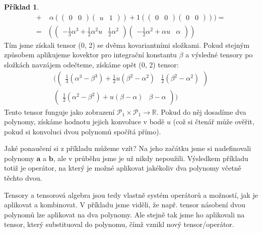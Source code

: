 \documentclass[a5paper,12pt]{amsbook}
\theoremstyle{definition}
\newtheorem{example}{Příklad}[chapter]
\newcommand{\myvec}[1]{\bm{#1}}
\begin{document}
\begin{example}
\begin{equation*}
\begin{split}
  + & \;\alpha((\begin{array}{cc}0 & 0\end{array})(\begin{array}{cc}u & 1\end{array}))
  + 1((\begin{array}{cc}0 & 0\end{array})(\begin{array}{cc}0 & 0\end{array}))
)
= \\ = &
((\begin{array}{cc}-\frac{1}{3}\alpha^3 + \frac{1}{2}\alpha^2u & \frac{1}{2}\alpha^2\end{array})
  (\begin{array}{cc}-\frac{1}{2}\alpha^2 + \alpha u & \alpha\end{array}))
\end{split}
\end{equation*}
Tím jsme získali tensor (0, 2) se dvěma kovariantními složkami. Pokud stejným způsobem aplikujeme
kovektor pro integrační konstantu $\beta$ a výsledné tensory po složkách navzájem odečteme, získáme
opět (0, 2) tensor:
\begin{equation*}
\begin{split}
((\begin{array}{cc}\frac{1}{3}(\alpha^3 - \beta^3) + \frac{1}{2}u(\beta^2 - \alpha^2) & \frac{1}{2}(\beta^2 - \alpha^2)\end{array}) \\
  (\begin{array}{cc}\frac{1}{2}(\alpha^2 - \beta^2) + u(\beta - \alpha) & \beta - \alpha\end{array}))
\end{split}
\end{equation*}
Tento tensor funguje jako zobrazení $\mathcal{P}_1\times\mathcal{P}_1\rightarrow\mathbb{R}$. Pokud do něj
dosadíme dva polynomy, získáme hodnotu jejich konvoluce v bodě $u$ (což si čtenář může ověřit, pokud si
konvoluci dvou polynomů spočítá přímo).

\end{example}

\noindent
Jaké ponaučení si z příkladu můžeme vzít? Na jeho začátku jsme si nadefinovali polynomy $\myvec{a}$
a $\myvec{b}$, ale v průběhu jsme je už nikdy nepoužili. Výsledkem příkladu totiž je operátor, na
který je možné aplikovat jakékoliv dva polynomy včetně těchto dvou.

Tensory a tensorová algebra jsou tedy vlastně systém operátorů a možností, jak je aplikovat a kombinovat.
V příkladu jsme viděli, že např. tensor násobení dvou polynomů lze aplikovat na dva polynomy. Ale stejně
tak jsme ho aplikovali na tensor, který substituoval do polynomu, čímž vznikl nový tensor/operátor.
\end{document}
